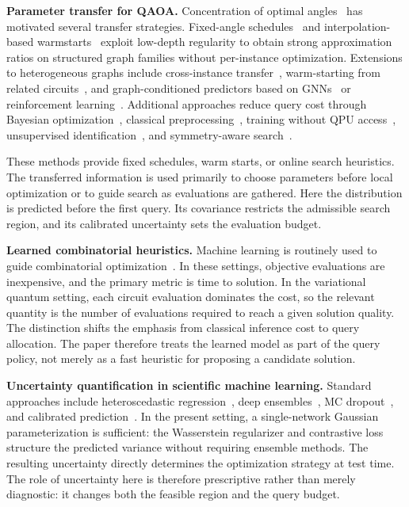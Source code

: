 \documentclass[aps,prx,reprint,superscriptaddress,longbibliography]{revtex4-2}
\newcommand{\QAOA}{\textnormal{\textsc{QAOA}}}
\newcommand{\GNN}{\textnormal{\textsc{GNN}}}
\begin{document}
\textbf{Parameter transfer for \QAOA{}.}
Concentration of optimal angles~\cite{brandao2018,akshay2021}
has motivated several transfer strategies.
Fixed-angle schedules~\cite{wurtz2021} and
interpolation-based warmstarts~\cite{zhou2020}
exploit low-depth regularity to obtain strong approximation ratios on
structured graph families without per-instance optimization.
Extensions to heterogeneous graphs include cross-instance
transfer~\cite{galda2021}, warm-starting from related
circuits~\cite{egger2021,sack2021}, and graph-conditioned predictors
based on \GNN{}s~\cite{jain2022} or reinforcement
learning~\cite{khairy2020}. Additional approaches reduce query cost
through Bayesian optimization~\cite{tibaldi2023},
classical preprocessing~\cite{shaydulin2023}, training without QPU
access~\cite{streif2020}, unsupervised identification~\cite{moussa2022},
and symmetry-aware search~\cite{sauvage2024}.

These methods provide fixed schedules, warm starts, or online search
heuristics. The transferred information is used primarily to choose
parameters before local optimization or to guide search as evaluations
are gathered. Here the distribution is predicted before the first
query. Its covariance restricts the admissible search region, and its
calibrated uncertainty sets the evaluation budget.

\textbf{Learned combinatorial heuristics.}
Machine learning is routinely used to guide combinatorial
optimization~\cite{bengio2021,cappart2023,khalil2017,dai2016,kool2019,schuetz2022}.
In these settings, objective evaluations are inexpensive, and the
primary metric is time to solution. In the variational quantum setting,
each circuit evaluation dominates the cost, so the relevant quantity is
the number of evaluations required to reach a given solution quality.
The distinction shifts the emphasis from classical inference cost to
query allocation. The paper therefore treats the learned model as part
of the query policy, not merely as a fast heuristic for proposing a
candidate solution.

\textbf{Uncertainty quantification in scientific machine learning.}
Standard approaches include heteroscedastic regression~\cite{nix1994,kendall2017},
deep ensembles~\cite{lakshminarayanan2017}, MC
dropout~\cite{gal2016}, and calibrated
prediction~\cite{kuleshov2018,abdar2021,hullermeier2021,psaros2023}.
In the present setting, a single-network Gaussian parameterization is
sufficient: the Wasserstein regularizer and contrastive loss structure
the predicted variance without requiring ensemble methods. The
resulting uncertainty directly determines the optimization strategy at
test time. The role of uncertainty here is therefore prescriptive rather
than merely diagnostic: it changes both the feasible region and the
query budget.
\end{document}
